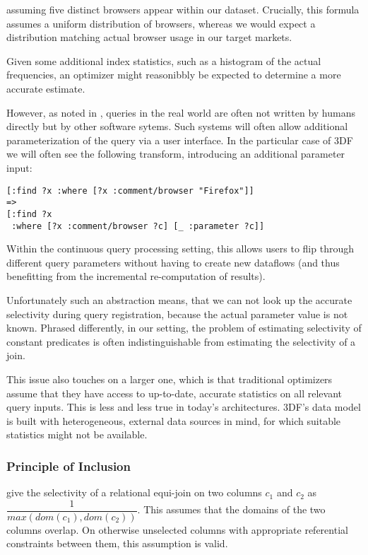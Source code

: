 \documentclass[../index.tex]{subfiles}
\begin{document}
assuming five distinct browsers appear within our dataset. Crucially,
this formula assumes a uniform distribution of browsers, whereas we
would expect a distribution matching actual browser usage in our
target markets.

Given some additional index statistics, such as a histogram of the
actual frequencies, an optimizer might reasonibbly be expected to
determine a more accurate estimate.

However, as noted in \cite{lohman2014query}, queries in the real world
are often not written by humans directly but by other software
sytems. Such systems will often allow additional parameterization of
the query via a user interface. In the particular case of 3DF we will
often see the following transform, introducing an additional parameter
input:

\begin{verbatim}
[:find ?x :where [?x :comment/browser "Firefox"]]
=>
[:find ?x 
 :where [?x :comment/browser ?c] [_ :parameter ?c]]
\end{verbatim}

Within the continuous query processing setting, this allows users to
flip through different query parameters without having to create new
dataflows (and thus benefitting from the incremental re-computation of
results).

Unfortunately such an abstraction means, that we can not look up the
accurate selectivity during query registration, because the actual
parameter value is not known. Phrased differently, in our setting, the
problem of estimating selectivity of constant predicates is often
indistinguishable from estimating the selectivity of a join.

This issue also touches on a larger one, which is that traditional
optimizers assume that they have access to up-to-date, accurate
statistics on all relevant query inputs. This is less and less true in
today's architectures. 3DF's data model is built with heterogeneous,
external data sources in mind, for which suitable statistics might not
be available.

\subsubsection{Principle of Inclusion}

\cite{selinger1979access} give the selectivity of a relational
equi-join on two columns $c_1$ and $c_2$ as
$\dfrac{1}{max(dom(c_1),dom(c_2))}$. This assumes that the domains of
the two columns overlap. On otherwise unselected columns with
appropriate referential constraints between them, this assumption is
valid.
\end{document}
